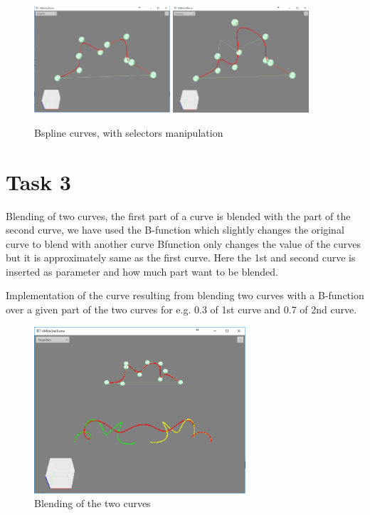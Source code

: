 \documentclass[a4,10pt]{article}
\begin{document}

\begin{figure}[h!]
	\centering
	\includegraphics[width=0.45\textwidth]{gfx/bspline.png}
	\includegraphics[width=0.45\textwidth]{gfx/bsplinemodified.png}
	\caption{Bspline curves, with selectors manipulation}
	\label{fig:spline}
\end{figure}
\section{Task 3}
Blending of two curves, the first part of a curve is blended with the part of the second curve, we have used the B-function which slightly changes the original curve to blend with another curve
Bfunction only changes the value of the curves but it is approximately same as the first curve. Here the 1st and second curve is inserted as parameter and how much part want to be blended.

Implementation of the curve resulting from blending two curves with a B-function over a given part of the two curves for e.g. 0.3 of 1st curve and 0.7 of 2nd curve.

\begin{figure}[h!]
	\centering
	\includegraphics[width=0.70\textwidth]{gfx/blendingcurves.png}
	\caption{Blending of the two curves}
	\label{fig:blendingcurve}
\end{figure}
\end{document}
